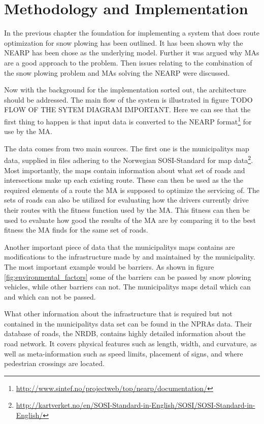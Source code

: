 \chapter{Methodology and Implementation}

In the previous chapter the foundation for implementing a system that does route optimization for snow plowing has been outlined. It has been shown why the NEARP has been chose as the underlying model. Further it was argued why MAs are a good approach to the problem. Then issues relating to the combination of the snow plowing problem and MAs solving the NEARP were discussed.

Now with the background for the implementation sorted out, the architecture should be addressed. The main flow of the system is illustrated in figure TODO FLOW OF THE SYTEM DIAGRAM IMPORTANT. Here we can see that the first thing to happen is that input data is converted to the NEARP format\footnote{\url{http://www.sintef.no/projectweb/top/nearp/documentation/}} for use by the MA.


The data comes from two main sources. The first one is the municipalitys map data, supplied in files adhering to the Norwegian SOSI-Standard for map data\footnote{\url{http://kartverket.no/en/SOSI-Standard-in-English/SOSI/SOSI-Standard-in-English/}}. Most importantly, the maps contain information about what set of roads and intersections make up each existing route. These can then be used as the the required elements of a route the MA is supposed to optimize the servicing of. The sets of roads can also be utilized for evaluating how the drivers currently drive their routes with the fitness function used by the MA. This fitness can then be used to evaluate how good the results of the MA are by comparing it to the best fitness the MA finds for the same set of roads.

Another important piece of data that the municipalitys maps contains are modifications to the infrastructure made by and maintained by the municipality. The most important example would be barriers. As shown in figure \ref{fig:environmental_factors} some of the barriers can be passed by snow plowing vehicles, while other barriers can not. The municipalitys maps detail which can and which can not be passed.

What other information about the infrastructure that is required but not contained in the municipalitys data set can be found in the NPRAs data. Their database of roads, the NRDB, contains highly detailed information about the road network. It covers physical features such as length, width, and curvature, as well as meta-information such as speed limits, placement of signs, and where pedestrian crossings are located.


